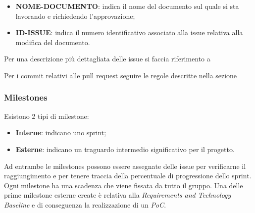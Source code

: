         \begin{itemize}
            \item \textbf{NOME-DOCUMENTO}: indica il nome del documento sul quale si sta lavorando e richiedendo l'approvazione;
            \item \textbf{ID-ISSUE}: indica il numero identificativo associato alla issue relativa alla modifica del documento.
        \end{itemize}

        Per una descrizione più dettagliata delle issue si faccia riferimento a 

        Per i commit relativi alle pull request seguire le regole descritte nella sezione 

        \subsubsection{Milestones}
        Esistono 2 tipi di milestone:
        \begin{itemize}
            \item \textbf{Interne}: indicano uno sprint;
            \item \textbf{Esterne}: indicano un traguardo intermedio significativo per il progetto.
        \end{itemize}
        Ad entrambe le milestones possono essere assegnate delle issue per verificarne il raggiungimento e per tenere traccia
        della percentuale di progressione dello sprint.
        Ogni milestone ha una scadenza che viene fissata da tutto il gruppo. Una delle prime milestone esterne create è
        relativa alla \textit{Requirements and Technology Baseline} e di conseguenza la realizzazione di un \textit{PoC}.


